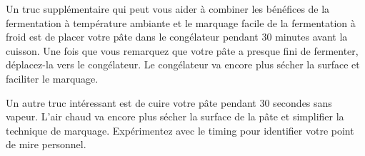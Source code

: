 Un truc supplémentaire qui peut vous aider à combiner les bénéfices
de la fermentation à température ambiante et le marquage facile de la fermentation à froid
est de placer votre pâte dans le congélateur pendant 30 minutes avant la cuisson.
Une fois que vous remarquez que votre pâte a presque fini de fermenter, déplacez-la vers le
congélateur. Le congélateur va encore plus sécher la surface et faciliter
le marquage.

Un autre truc intéressant est de cuire votre pâte pendant 30 secondes sans vapeur.
L'air chaud va encore plus sécher la surface de la pâte et simplifier
la technique de marquage. Expérimentez avec le timing pour identifier votre point de mire personnel.